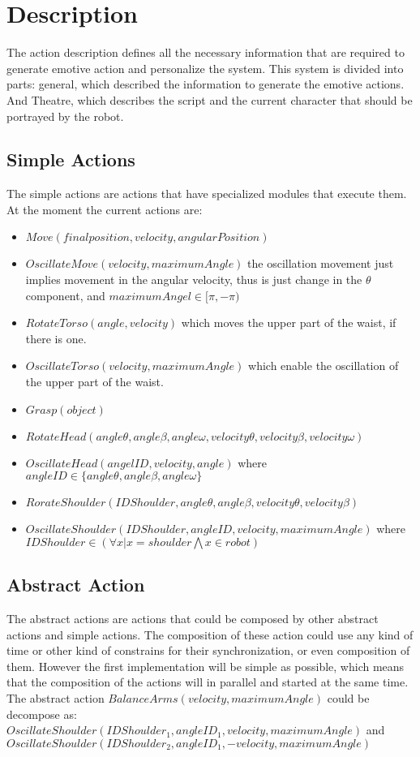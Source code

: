 \section{Description}
The action description defines all the necessary information that are required to generate emotive action and personalize the system. This system is divided into parts: general, which described the information to generate the emotive actions. And Theatre, which describes the script and the current character that should be portrayed by the robot.
\subsection{Simple Actions}
The simple actions are actions that have specialized modules that execute them. At the moment the current actions are:
\begin{itemize}
	\item $Move(finalposition,velocity,angularPosition)$
	\item $OscillateMove(velocity,maximumAngle)$ the oscillation movement just implies movement in the angular velocity, thus is just change in the $\theta$ component, and $maximumAngel\in[\pi,-\pi)$
	\item $RotateTorso(angle,velocity)$ which moves the upper part of the waist, if there is one.
	\item $OscillateTorso(velocity,maximumAngle)$ which enable the oscillation of the upper part of the waist.
	\item $Grasp(object)$
	\item $RotateHead(angle\theta,angle\beta,angle\omega,velocity\theta,velocity\beta,velocity\omega)$
	\item $OscillateHead(angelID,velocity,angle)$ where\\ $angleID\in \lbrace angle\theta,angle\beta,angle\omega \rbrace$
	\item $RorateShoulder(IDShoulder,angle\theta,angle\beta,velocity\theta,velocity\beta)$
	\item $OscillateShoulder(IDShoulder,angleID,velocity,maximumAngle)$ where\\ $IDShoulder\in (\forall x| x=shoulder\bigwedge x\in robot)$
\end{itemize} 
\subsection{Abstract Action}
The abstract actions are actions that could be composed by other abstract actions and simple actions. The composition of these action could use any kind of time or other kind of constrains for their synchronization, or even composition of them. However the first implementation will be simple as possible, which means that the composition of the actions will in parallel and started at the same time.\\
The abstract action $BalanceArms(velocity,maximumAngle)$ could be decompose as:
$OscillateShoulder(IDShoulder_1,angleID_1,velocity,maximumAngle)$ and $OscillateShoulder(IDShoulder_2,angleID_1,-velocity,maximumAngle)$
